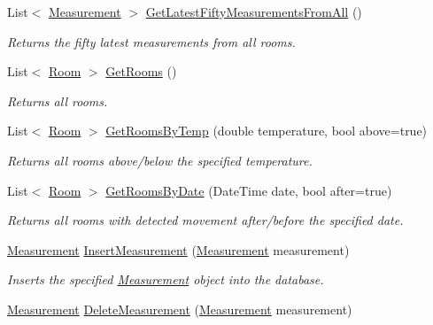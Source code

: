 \begin{DoxyCompactItemize}
List$<$ \hyperlink{class_w_c_f_service_web_role1_1_1_measurement}{Measurement} $>$ \hyperlink{class_w_c_f_service_web_role1_1_1_service1_afe243908ef6a247439b92823d04d1108}{Get\+Latest\+Fifty\+Measurements\+From\+All} ()
\begin{DoxyCompactList}\small\item\em Returns the fifty latest measurements from all rooms. \end{DoxyCompactList}\item 
List$<$ \hyperlink{class_w_c_f_service_web_role1_1_1_room}{Room} $>$ \hyperlink{class_w_c_f_service_web_role1_1_1_service1_a5534cff1f8e4868d5f55380da04b3a7a}{Get\+Rooms} ()
\begin{DoxyCompactList}\small\item\em Returns all rooms. \end{DoxyCompactList}\item 
List$<$ \hyperlink{class_w_c_f_service_web_role1_1_1_room}{Room} $>$ \hyperlink{class_w_c_f_service_web_role1_1_1_service1_a085108986fe8820c44e8dcad62750cec}{Get\+Rooms\+By\+Temp} (double temperature, bool above=true)
\begin{DoxyCompactList}\small\item\em Returns all rooms above/below the specified temperature. \end{DoxyCompactList}\item 
List$<$ \hyperlink{class_w_c_f_service_web_role1_1_1_room}{Room} $>$ \hyperlink{class_w_c_f_service_web_role1_1_1_service1_afd71e5b1f7aad89f3655eb9c265c3705}{Get\+Rooms\+By\+Date} (Date\+Time date, bool after=true)
\begin{DoxyCompactList}\small\item\em Returns all rooms with detected movement after/before the specified date. \end{DoxyCompactList}\item 
\hyperlink{class_w_c_f_service_web_role1_1_1_measurement}{Measurement} \hyperlink{class_w_c_f_service_web_role1_1_1_service1_a91cca3523909a15506670a99f0a13739}{Insert\+Measurement} (\hyperlink{class_w_c_f_service_web_role1_1_1_measurement}{Measurement} measurement)
\begin{DoxyCompactList}\small\item\em Inserts the specified \hyperlink{class_w_c_f_service_web_role1_1_1_measurement}{Measurement} object into the database. \end{DoxyCompactList}\item 
\hyperlink{class_w_c_f_service_web_role1_1_1_measurement}{Measurement} \hyperlink{class_w_c_f_service_web_role1_1_1_service1_a0a05f8caeea4bfc3fb5e9675ae0a04e8}{Delete\+Measurement} (\hyperlink{class_w_c_f_service_web_role1_1_1_measurement}{Measurement} measurement)

\end{DoxyCompactItemize}
